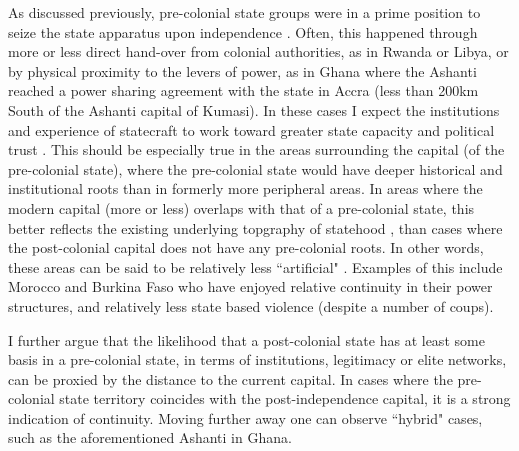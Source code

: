 \documentclass[12pt]{article}
\begin{document}
As discussed previously, pre-colonial state groups were in a prime position to
seize the state apparatus upon independence \citep{Paine2019}. Often, this
happened through more or less direct hand-over from colonial authorities, as in
Rwanda or Libya, or by physical proximity to the levers of power, as in Ghana
where the Ashanti reached a power sharing agreement with the state in Accra
(less than 200km South of the Ashanti capital of Kumasi). In these cases I
expect the institutions and experience of statecraft to work toward greater
state capacity and political trust \citep{Depetris-Chauvin2016}. This should be
especially true in the areas surrounding the capital (of the pre-colonial
state), where the pre-colonial state would have deeper historical and institutional
roots than in formerly more peripheral areas. In areas where the modern capital
(more or less) overlaps with that of a pre-colonial state, this better reflects
the existing underlying topgraphy of statehood , than cases where the
post-colonial capital does not have any pre-colonial roots. In other words,
these areas can be said to be relatively less ``artificial" \citep{Alesina2011}.
Examples of this include Morocco and Burkina Faso who have enjoyed relative
continuity in their power structures, and relatively less state based violence
(despite a number of coups). 

I further argue that the likelihood that a post-colonial state has at least some
basis in a pre-colonial state, in terms of institutions, legitimacy or elite
networks, can be proxied by the distance to the current capital. In cases where
the pre-colonial state territory coincides with the post-independence capital, it
is a strong indication of continuity. Moving further away one can observe
``hybrid" cases, such as the aforementioned Ashanti in Ghana. 


\end{document}
